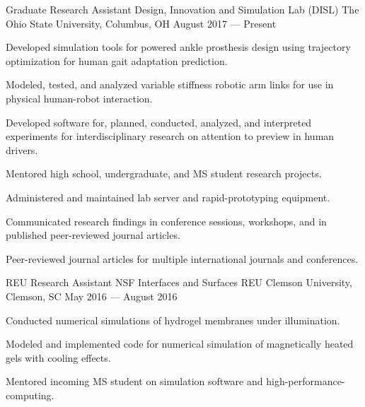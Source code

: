 
\vspace{-6mm}

\begin{cventries}
  \cventry
    {Graduate Research Assistant} %
    {Design, Innovation and Simulation Lab (DISL)} %
    {The Ohio State University, Columbus, OH} %
    {August 2017 --- Present} %
    {
      \begin{cvitems} %
      	\item{Developed simulation tools for powered ankle prosthesis design using trajectory optimization for human gait adaptation prediction.}
        \item{Modeled, tested, and analyzed variable stiffness robotic arm links for use in physical human-robot interaction.}
        \item{Developed software for, planned, conducted, analyzed, and interpreted experiments for interdisciplinary research on attention to preview in human drivers.}
        \item{Mentored high school, undergraduate, and MS student research projects.}
        \item{Administered and maintained lab server and rapid-prototyping equipment.}
        \item{Communicated research findings in conference sessions, workshops, and in published peer-reviewed journal articles.}
        \item{Peer-reviewed journal articles for multiple international journals and conferences.}
      \end{cvitems}
    }

  \cventry
    {REU Research Assistant} %
    {NSF Interfaces and Surfaces REU} %
    {Clemson University, Clemson, SC} %
    {May 2016 --- August 2016} %
    {
      \begin{cvitems} %
        \item {Conducted numerical simulations of hydrogel membranes under illumination.}
        \item {Modeled and implemented code for numerical simulation of magnetically heated gels with cooling effects.}
        \item {Mentored incoming MS student on simulation software and high-performance-computing.}
      \end{cvitems}
    }


\end{cventries}
